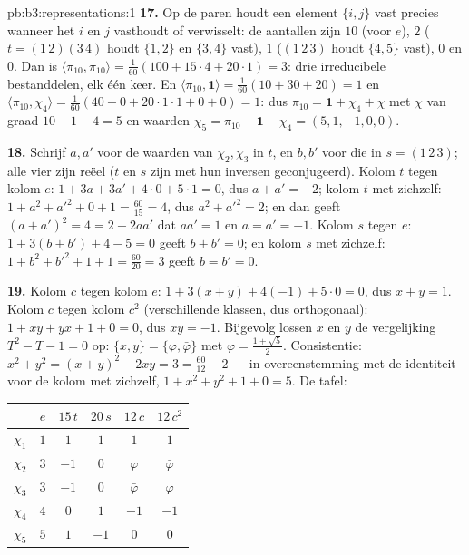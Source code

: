 \begin{solution}{pb:b3:representations:1}
\textbf{17.} Op de paren houdt een element $\{i,j\}$ vast precies
wanneer het $i$ en $j$ vasthoudt of verwisselt: de aantallen zijn
$10$ (voor $e$), $2$ ($t = (1\,2)(3\,4)$ houdt $\{1,2\}$ en
$\{3,4\}$ vast), $1$ ($(1\,2\,3)$ houdt $\{4,5\}$ vast), $0$ en
$0$. Dan is $\langle\pi_{10}, \pi_{10}\rangle = \frac1{60}(100 +
15\cdot4 + 20\cdot1) = 3$: drie irreducibele bestanddelen, elk één
keer. En $\langle\pi_{10}, \mathbf 1\rangle = \frac1{60}(10 + 30 +
20) = 1$ en $\langle\pi_{10}, \chi_4\rangle = \frac1{60}(40 + 0 +
20\cdot1\cdot1 + 0 + 0) = 1$: dus $\pi_{10} = \mathbf 1 + \chi_4 +
\chi$ met $\chi$  van graad $10 - 1 - 4 = 5$ en waarden
$\chi_5 = \pi_{10} - \mathbf 1 - \chi_4 = (5, 1, -1, 0, 0)$.

\textbf{18.} Schrijf $a, a'$ voor de waarden van $\chi_2, \chi_3$
in $t$, en $b, b'$ voor die in $s = (1\,2\,3)$; alle vier zijn
reëel ($t$ en $s$ zijn met hun inversen geconjugeerd). Kolom $t$
tegen kolom $e$: $1 + 3a + 3a' + 4\cdot0 + 5\cdot1 = 0$, dus $a +
a' = -2$; kolom $t$ met zichzelf: $1 + a^2 + a'^2 + 0 + 1 =
\frac{60}{15} = 4$, dus $a^2 + a'^2 = 2$; en dan geeft $(a + a')^2
= 4 = 2 + 2aa'$ dat $aa' = 1$ en $a = a' = -1$. Kolom $s$ tegen
$e$: $1 + 3(b + b') + 4 - 5 = 0$ geeft $b + b' = 0$; en kolom $s$
met zichzelf: $1 + b^2 + b'^2 + 1 + 1 = \frac{60}{20} = 3$ geeft
$b = b' = 0$.

\textbf{19.} Kolom $c$ tegen kolom $e$: $1 + 3(x + y) + 4(-1) +
5\cdot0 = 0$, dus $x + y = 1$. Kolom $c$ tegen kolom $c^2$
(verschillende klassen, dus orthogonaal): $1 + xy + yx + 1 + 0 =
0$, dus $xy = -1$. Bijgevolg lossen $x$ en $y$ de vergelijking
$T^2 - T - 1 = 0$ op: $\{x, y\} = \{\varphi, \bar\varphi\}$ met
$\varphi = \frac{1 + \sqrt5}2$. Consistentie: $x^2 + y^2 = (x+y)^2
- 2xy = 3 = \frac{60}{12} - 2$ --- in overeenstemming met de
identiteit voor de kolom met zichzelf, $1 + x^2 + y^2 + 1 + 0 =
5$. De tafel:
\begin{center}
\begin{tabular}{c|ccccc}
 & $e$ & $15\,t$ & $20\,s$ & $12\,c$ & $12\,c^2$\\
\hline
$\chi_1$ & $1$ & $1$ & $1$ & $1$ & $1$\\
$\chi_2$ & $3$ & $-1$ & $0$ & $\varphi$ & $\bar\varphi$\\
$\chi_3$ & $3$ & $-1$ & $0$ & $\bar\varphi$ & $\varphi$\\
$\chi_4$ & $4$ & $0$ & $1$ & $-1$ & $-1$\\
$\chi_5$ & $5$ & $1$ & $-1$ & $0$ & $0$\\
\end{tabular}
\end{center}


\end{solution}

